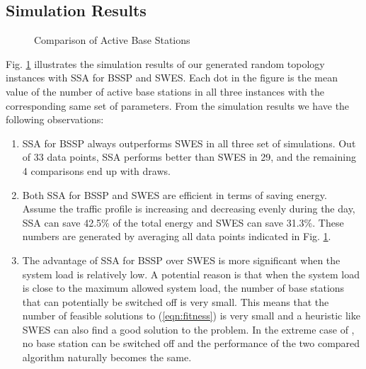 \documentclass[conference]{IEEEtran}
\begin{document}
\subsection{Simulation Results}

\begin{figure}
  \center
  \caption{Comparison of Active Base Stations}
  \label{fig:result}
\end{figure}

Fig. \ref{fig:result} illustrates the simulation results of our generated random topology instances with SSA for BSSP and SWES. Each dot in the figure is the mean value of the number of active base stations in all three instances with the corresponding same set of parameters. From the simulation results we have the following observations:

\begin{enumerate}
\item SSA for BSSP always outperforms SWES in all three set of simulations. Out of 33 data points, SSA performs better than SWES in 29, and the remaining 4 comparisons end up with draws.

\item Both SSA for BSSP and SWES are efficient in terms of saving energy. Assume the traffic profile is increasing and decreasing evenly during the day, SSA can save 42.5\% of the total energy and SWES can save 31.3\%. These numbers are generated by averaging all data points indicated in Fig. \ref{fig:result}.

\item The advantage of SSA for BSSP over SWES is more significant when the system load is relatively low. A potential reason is that when the system load is close to the maximum allowed system load, the number of base stations that can potentially be switched off is very small. This means that the number of feasible solutions to (\ref{eqn:fitness}) is very small and a heuristic like SWES can also find a good solution to the problem. In the extreme case of , no base station can be switched off and the performance of the two compared algorithm naturally becomes the same.
\end{enumerate}
\end{document}
